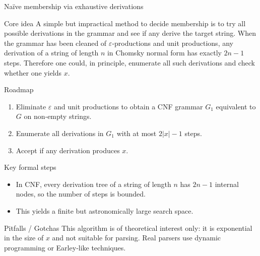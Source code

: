 \begin{frame}[t]{Naïve membership via exhaustive derivations}
  \begin{tblock}{Core idea}
    A simple but impractical method to decide membership is to try all
    possible derivations in the grammar and see if any derive the
    target string.  When the grammar has been cleaned of
    $\varepsilon$‑productions and unit productions, any derivation of a
    string of length $n$ in Chomsky normal form has exactly $2n-1$ steps.
    Therefore one could, in principle, enumerate all such derivations and
    check whether one yields $x$.
  \end{tblock}
  \begin{tblock}{Roadmap}
    \begin{enumerate}
      \item Eliminate $\varepsilon$ and unit productions to obtain a
        CNF grammar $G_1$ equivalent to $G$ on non‑empty strings.
      \item Enumerate all derivations in $G_1$ with at most $2|x|-1$
        steps.
      \item Accept if any derivation produces $x$.
    \end{enumerate}
  \end{tblock}
  \begin{tblock}{Key formal steps}
    \begin{itemize}
      \item In CNF, every derivation tree of a string of length $n$ has
        $2n-1$ internal nodes, so the number of steps is bounded.
      \item This yields a finite but astronomically large search space.
    \end{itemize}
  \end{tblock}
  \begin{talert}{Pitfalls / Gotchas}
    This algorithm is of theoretical interest only: it is exponential in
    the size of $x$ and not suitable for parsing.  Real parsers use
    dynamic programming or Earley‑like techniques.
  \end{talert}
  \label{fr:6.3-03}
\end{frame}

